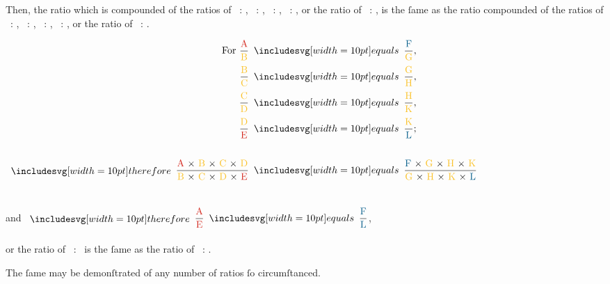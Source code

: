 \documentclass[12pt,preview]{standalone}
\begin{document}
\begin{minipage}{\textwidth}
    \hfill

    \raggedright Then, the ratio which is compounded of the ratios of \redA\ : \yellowB, \yellowB\ : \yellowC, \yellowC\ : \yellowD, \yellowD\ : \redE, or the ratio of \redA\ : \redE, is the ſame as the ratio compounded of the ratios of \blueF\ : \yellowG, \yellowG\ : \yellowH, \yellowH\ : \yellowK, \yellowK\ : \blueL, or the ratio of \blueF\ : \blueL.

    \hfill

    \begin{center}
        $\begin{aligned} \text{For } \dfrac{\text{\redA}}{\text{\yellowB}}                                                                      & \bequals \dfrac{\text{\blueF}}{\text{\yellowG}},                                                                      \\[0.5ex]
                \dfrac{\text{\yellowB}}{\text{\yellowC}}                                                                               & \bequals \dfrac{\text{\yellowG}}{\text{\yellowH}},                                                                    \\[0.5ex]
                \dfrac{\text{\yellowC}}{\text{\yellowD}}                                                                               & \bequals \dfrac{\text{\yellowH}}{\text{\yellowK}},                                                                    \\[0.5ex]
                \dfrac{\text{\yellowD}}{\text{\redE}}                                                                                  & \bequals \dfrac{\text{\yellowK}}{\text{\blueL}};                                                                      \\[0.5ex]
                \hfill                                                                                                                                                                                                                                         \\
                \btherefore \dfrac{\text{\redA\ × \yellowB\ × \yellowC\ × \yellowD}}{\text{\yellowB\ × \yellowC\ × \yellowD\ × \redE}} & \bequals \dfrac{\text{\blueF\ × \yellowG\ × \yellowH\ × \yellowK}}{\text{\yellowG\ × \yellowH\ × \yellowK\ × \blueL}}\end{aligned}$\\
        \hfill\\
        \hfill\\
        and $\btherefore \dfrac{\text{\redA}}{\text{\redE}} \bequals \dfrac{\text{\blueF}}{\text{\blueL}}$,\\
        \hfill\\
        or the ratio of \redA\ : \redE\ is the ſame as the ratio of \blueF\ : \blueL.
    \end{center}

    \hfill

    The ſame may be demonſtrated of any number of ratios ſo circumſtanced.
\end{minipage}
\end{document}
